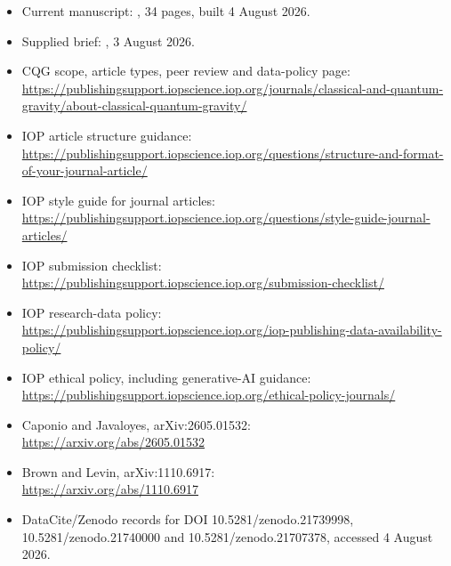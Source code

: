 \documentclass[11pt,a4paper]{article}
\begin{document}
\begingroup
\small
\raggedright
{}
\begin{itemize}
  \item Current manuscript: , 34 pages, built 4 August 2026.
  \item Supplied brief: , 3 August 2026.
  \item CQG scope, article types, peer review and data-policy page:\\
  \url{https://publishingsupport.iopscience.iop.org/journals/classical-and-quantum-gravity/about-classical-quantum-gravity/}
  \item IOP article structure guidance:\\
  \url{https://publishingsupport.iopscience.iop.org/questions/structure-and-format-of-your-journal-article/}
  \item IOP style guide for journal articles:\\
  \url{https://publishingsupport.iopscience.iop.org/questions/style-guide-journal-articles/}
  \item IOP submission checklist:\\
  \url{https://publishingsupport.iopscience.iop.org/submission-checklist/}
  \item IOP research-data policy:\\
  \url{https://publishingsupport.iopscience.iop.org/iop-publishing-data-availability-policy/}
  \item IOP ethical policy, including generative-AI guidance:\\
  \url{https://publishingsupport.iopscience.iop.org/ethical-policy-journals/}
  \item Caponio and Javaloyes, arXiv:2605.01532:\\
  \url{https://arxiv.org/abs/2605.01532}
  \item Brown and Levin, arXiv:1110.6917:\\
  \url{https://arxiv.org/abs/1110.6917}
  \item DataCite/Zenodo records for DOI 10.5281/zenodo.21739998,
  10.5281/zenodo.21740000 and 10.5281/zenodo.21707378, accessed 4 August 2026.
\end{itemize}
\endgroup
\end{document}
